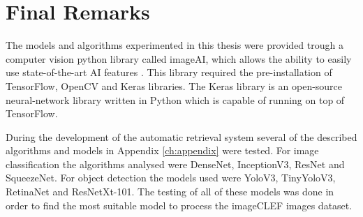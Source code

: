 \section{Final Remarks}


The models and algorithms experimented in this thesis were provided trough a computer vision python library called imageAI, which allows the ability to easily use state-of-the-art AI features \cite{ImageAI}. This library required the pre-installation of TensorFlow, OpenCV and Keras libraries. The Keras library \cite{CholletFrancois2015} is an open-source neural-network library written in Python which is capable of running on top of TensorFlow.

During the development of the automatic retrieval system several of the described algorithms and models in Appendix \ref{ch:appendix} were tested. For image classification the algorithms analysed were DenseNet, InceptionV3, ResNet and SqueezeNet. For object detection the models used were YoloV3, TinyYoloV3, RetinaNet and ResNetXt-101. The testing of all of these models was done in order to find the most suitable model to process the imageCLEF images dataset.